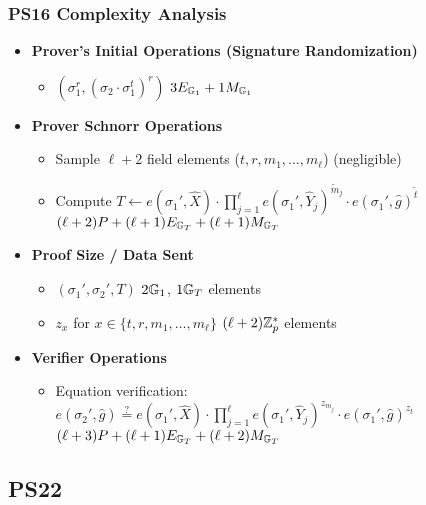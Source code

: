 {\subsubsection{PS16 Complexity Analysis \cite{sako_short_2016}}
\begin{itemize}
    \item \textbf{Prover's Initial Operations (Signature Randomization)}
    \begin{itemize}
        \item $(\sigma_1^r, (\sigma_2 \cdot \sigma_1^t)^r)$ \qquad $3E_{\mathbb{G}_1} + 1M_{\mathbb{G}_1}$
    \end{itemize}
    
\item \textbf{Prover Schnorr Operations}
    \begin{itemize}
        \item Sample $\ell+2$ field elements ($t, r, m_1,\ldots,m_\ell$) \qquad (negligible)
        \item Compute $T \gets e(\sigma_1',\hat{X}) \cdot \prod_{j=1}^\ell e(\sigma_1', \widehat{Y}_j)^{\tilde{m}_j} \cdot e(\sigma_1', \hat{g})^{\tilde{t}}$ \qquad $(\ell+2)P + (\ell+1)E_{\mathbb{G}_T} + (\ell+1)M_{\mathbb{G}_T}$
    \end{itemize}
    
\item \textbf{Proof Size / Data Sent}
    \begin{itemize}
        \item $(\sigma_1', \sigma_2', T)$ \qquad $2\mathbb{G}_1$, $1\mathbb{G}_T$ elements
        \item $z_x$ for $x \in \{t,r,m_1,\ldots,m_\ell\}$ \qquad $(\ell+2)\mathbb{Z}_p^*$ elements
    \end{itemize}
    
\item \textbf{Verifier Operations}
    \begin{itemize}
        \item Equation verification: $e(\sigma_2', \hat{g}) \stackrel{?}{=} e(\sigma_1',\hat{X}) \cdot \prod_{j=1}^\ell e(\sigma_1', \widehat{Y}_j)^{z_{m_j}} \cdot e(\sigma_1', \hat{g})^{z_t}$ \qquad $(\ell+3)P + (\ell+1)E_{\mathbb{G}_T} + (\ell+2)M_{\mathbb{G}_T}$
    \end{itemize}
\end{itemize}


% 
% 


% 
% 


\newpage
\subsection{PS22 \cite{tomescu2022utt}}

}
